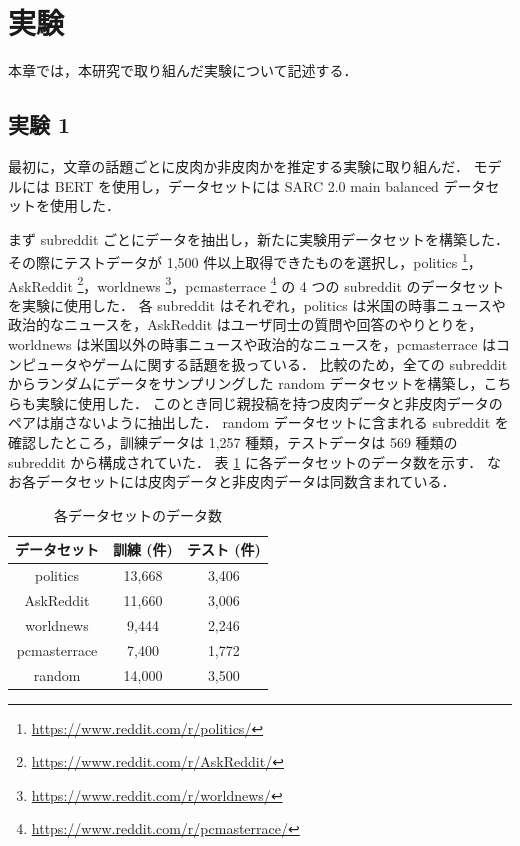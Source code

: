\newpage

\changeindent{0cm}
\section{実験}
\changeindent{2cm}


本章では，本研究で取り組んだ実験について記述する．

\subsection{実験 1}

最初に，文章の話題ごとに皮肉か非皮肉かを推定する実験に取り組んだ．
モデルには BERT を使用し，データセットには SARC 2.0 main balanced データセットを使用した．
\par
まず subreddit ごとにデータを抽出し，新たに実験用データセットを構築した．
その際にテストデータが 1,500 件以上取得できたものを選択し，politics \footnote{\url{https://www.reddit.com/r/politics/}}，AskReddit \footnote{\url{https://www.reddit.com/r/AskReddit/}}，worldnews \footnote{\url{https://www.reddit.com/r/worldnews/}}，pcmasterrace \footnote{\url{https://www.reddit.com/r/pcmasterrace/}} の 4 つの subreddit のデータセットを実験に使用した．
各 subreddit はそれぞれ，politics は米国の時事ニュースや政治的なニュースを，AskReddit はユーザ同士の質問や回答のやりとりを，worldnews は米国以外の時事ニュースや政治的なニュースを，pcmasterrace はコンピュータやゲームに関する話題を扱っている．
比較のため，全ての subreddit からランダムにデータをサンプリングした random データセットを構築し，こちらも実験に使用した．
このとき同じ親投稿を持つ皮肉データと非皮肉データのペアは崩さないように抽出した．
random データセットに含まれる subreddit を確認したところ，訓練データは 1,257 種類，テストデータは 569 種類の subreddit から構成されていた．
表 \ref{tb:4_subreddit_data} に各データセットのデータ数を示す．
なお各データセットには皮肉データと非皮肉データは同数含まれている．

\begin{table}[b]
  \caption{各データセットのデータ数}
  \label{tb:4_subreddit_data}
  \centering
  \begin{tabular}{c c c} \hline

データセット & 訓練 (件) & テスト (件) \\ \hline
politics & 13,668 & 3,406 \\
AskReddit & 11,660 & 3,006 \\
worldnews & 9,444 & 2,246 \\
pcmasterrace & 7,400 & 1,772 \\
random & 14,000 & 3,500 \\ \hline

  \end{tabular}
\end{table}

